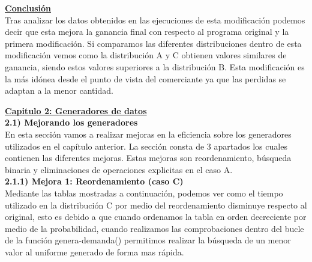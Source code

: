 \documentclass{article}
\begin{document}
	\newpage
	
	\underline{\textbf{Conclusión}} \\
	
	Tras analizar los datos obtenidos en las ejecuciones de esta modificación podemos decir que esta mejora la ganancia final con respecto al programa original y la primera modificación. Si comparamos las diferentes distribuciones dentro de esta modificación vemos como la distribución A y C obtienen valores similares de ganancia, siendo estos valores superiores a la distribución B. Esta modificación es la más idónea desde el punto de vista del comerciante ya que las perdidas se adaptan a la menor cantidad. 
	
	\vspace{2cm}
	
	
	
	
	\Large\underline{\textbf{Capitulo 2: Generadores de datos}} \\
	
	\normalsize{\textbf{2.1) Mejorando los generadores}} \\
	
	En esta sección vamos a realizar mejoras en la eficiencia sobre los generadores utilizados en el capítulo anterior. La sección consta de 3 apartados los cuales contienen las diferentes mejoras. Estas mejoras son reordenamiento, búsqueda binaria y eliminaciones de operaciones explicitas en el caso A. \\
	
	\normalsize{\textbf{2.1.1) Mejora 1: Reordenamiento (caso C)}} \\
	
	Mediante las tablas mostradas a continuación, podemos ver como el tiempo utilizado en la distribución C por medio del reordenamiento disminuye respecto al original, esto es debido a que cuando ordenamos la tabla en orden decreciente por medio de la probabilidad, cuando realizamos las comprobaciones dentro del bucle de la función genera-demanda() permitimos realizar la búsqueda de un menor valor al uniforme generado de forma mas rápida.
	
	\vspace{1cm}
	
\end{document}
